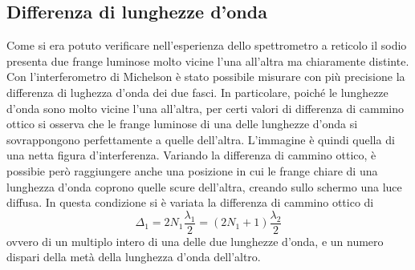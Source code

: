 \documentclass[a4paper,11pt]{article}
\begin{document}
	\subsection{Differenza di lunghezze d'onda}
	Come si era potuto verificare nell'esperienza dello spettrometro a reticolo il sodio presenta due frange luminose molto vicine l'una all'altra ma chiaramente distinte. Con l'interferometro di Michelson è stato possibile misurare con più precisione la differenza di lughezza d'onda dei due fasci. In particolare, poiché le lunghezze d'onda sono molto vicine l'una all'altra, per certi valori di differenza di cammino ottico si osserva che le frange luminose di una delle lunghezze d'onda si sovrappongono perfettamente a quelle dell'altra. L'immagine è quindi quella di una netta figura d'interferenza. Variando la differenza di cammino ottico, è possibie però raggiungere anche una posizione in cui le frange chiare di una lunghezza d'onda coprono quelle scure dell'altra, creando sullo schermo una luce diffusa. In questa condizione si è variata la differenza di cammino ottico di
	\begin{equation}\label{delta1}
		\Delta_1=2N_1\frac{\lambda_1}{2}=(2N_1+1)\frac{\lambda_2}{2}
	\end{equation}
	ovvero di un multiplo intero di una delle due lunghezze d'onda, e un numero dispari della metà della lunghezza d'onda dell'altro.
	
\end{document}
